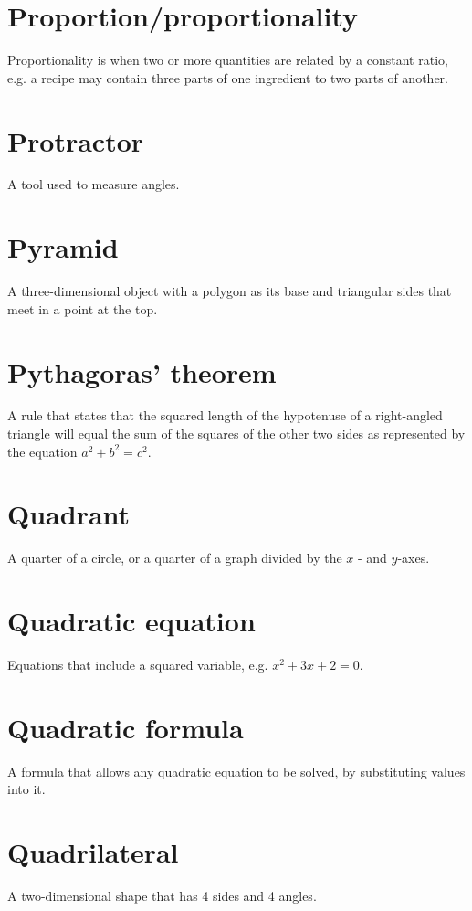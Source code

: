 \documentclass[10pt]{article}
\begin{document}
\section*{Proportion/proportionality}
Proportionality is when two or more quantities are related by a constant ratio, e.g. a recipe may contain three parts of one ingredient to two parts of another.

\section*{Protractor}
A tool used to measure angles.

\section*{Pyramid}
A three-dimensional object with a polygon as its base and triangular sides that meet in a point at the top.

\section*{Pythagoras' theorem}
A rule that states that the squared length of the hypotenuse of a right-angled triangle will equal the sum of the squares of the other two sides as represented by the equation $a^{2}+b^{2}=c^{2}$.

\section*{Quadrant}
A quarter of a circle, or a quarter of a graph divided by the $x$ - and $y$-axes.

\section*{Quadratic equation}
Equations that include a squared variable, e.g. $x^{2}+3 x+2=0$.

\section*{Quadratic formula}
A formula that allows any quadratic equation to be solved, by substituting values into it.

\section*{Quadrilateral}
A two-dimensional shape that has 4 sides and 4 angles.
\end{document}
